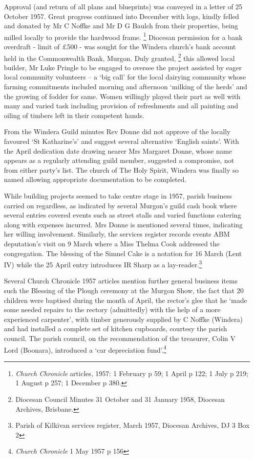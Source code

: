 Approval (and return of all plans and blueprints) was conveyed in a letter of 25 October 1957. Great progress continued into December with logs, kindly felled and donated by Mr C Noffke and Mr D G Baulch from their properties, being milled locally to provide the hardwood frame. \footnote{\emph{Church Chronicle} articles, 1957: 1 February p 59; 1 April p 122; 1 July p 219; 1 August p 257; 1 December p 380.} Diocesan permission for a bank overdraft - limit of £500 - was sought for the Windera church's bank account held in the Commonwealth Bank, Murgon. Duly granted, \footnote{Diocesan Council Minutes 31 October and 31 January 1958, Diocesan Archives, Brisbane.} this allowed local builder, Mr Luke Pringle to be engaged to oversee the project assisted by eager local community volunteers -- a `big call' for the local dairying community whose farming commitments included morning and afternoon `milking of the herds' and the growing of fodder for same. Women willingly played their part as well with many and varied task including provision of refreshments and all painting and oiling of timbers left in their competent hands.

From the Windera Guild minutes Rev Donne did not approve of the locally favoured `St Katharine's' and suggest several alternative `English saints'. With the April dedication date drawing nearer Mrs Margaret Donne, whose name appears as a regularly attending guild member, suggested a compromise, not from either party's list. The church of The Holy Spirit, Windera was finally so named allowing appropriate documentation to be completed.

While building projects seemed to take centre stage in 1957, parish business carried on regardless, as indicated by several Murgon's guild cash book where several entries covered events such as street stalls and varied functions catering along with expenses incurred. Mrs Donne is mentioned several times, indicating her willing involvement. Similarly, the services register records events ABM deputation's visit on 9 March where a Miss Thelma Cook addressed the congregation. The blessing of the Simnel Cake is a notation for 16 March (Lent IV) while the 25 April entry introduces IR Sharp as a lay-reader.\footnote{Parish of Kilkivan services register, March 1957, Diocesan Archives, DJ 3 Box 2}

Several Church Chronicle 1957 articles mention further general business items such the Blessing of the Plough ceremony at the Murgon Show, the fact that 20 children were baptised during the month of April, the rector's glee that he `made some needed repairs to the rectory (admittedly) with the help of a more experienced carpenter', with timber generously supplied by C Noffke (Windera) and had installed a complete set of kitchen cupboards, courtesy the parish council. The parish council, on the recommendation of the treasurer, Colin V Lord (Boonara), introduced a `car depreciation fund'.\footnote{\emph{Church Chronicle} 1 May 1957 p 156}

